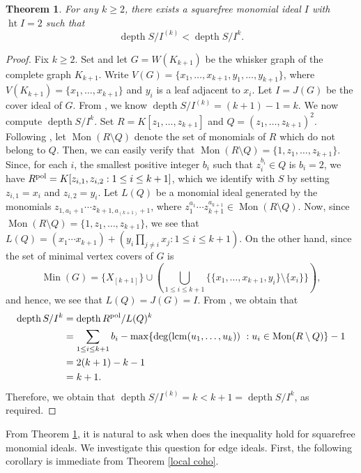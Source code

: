 \documentclass[12pt]{amsart}
\newtheorem{thm}{Theorem}[section]
\theoremstyle{definition}
\theoremstyle{remark}
\DeclareMathOperator{\depth}{depth}
\DeclareMathOperator{\height}{ht}
\DeclareMathOperator{\Min}{Min}
\DeclareMathOperator{\lcm}{lcm}
\begin{document}
\begin{thm}\label{ex}
For any $k\geq2$, there exists a squarefree monomial ideal $I$ with $\height I=2$ such that 
$$\depth S/I^{(k)}<\depth S/I^{k}.$$
\end{thm}
\begin{proof}
Fix $k\geq2$. Set and let $G=W(K_{k+1})$ be the whisker graph of the complete graph $K_{k+1}$. Write $V(G)=\{x_1,\ldots,x_{k+1},y_1,\ldots,y_{k+1}\}$,
where $V(K_{k+1})=\{x_1,\ldots,x_{k+1}\}$ and $y_i$ is a leaf adjacent to $x_i$. Let $I=J(G)$ be the cover ideal of $G$. From \cite[Corollary 3.2]{fy2024}, we know $\depth S/I^{(k)}=(k+1)-1=k$. We now compute $\depth S/I^k$. Set $R=K[z_1,\ldots,z_{k+1}]$ and $Q=(z_1,\ldots,z_{k+1})^{2}$. Following \cite{bhhm2015}, let $\operatorname{Mon}(R\setminus Q)$ denote the set of monomials of $R$ which do not belong to $Q$. Then, we can easily verify that $\operatorname{Mon}(R\setminus Q)=\{1,z_{1},\ldots,z_{k+1}\}$. Since, for each $i$, the smallest positive integer $b_i$ such that $z_i^{b_i}\in Q$ is $b_i=2$, we have $R^{\rm pol}=K[z_{i,1},z_{i,2}:1\leq i\leq k+1]$, which we identify with $S$ by setting $z_{i,1}=x_{i}$ and $z_{i,2}=y_{i}$. Let $L(Q)$ be a monomial ideal generated by the monomials $z_{1,a_1+1}\cdots z_{k+1,a_{(k+1)}+1}$, where $z_1^{a_1}\cdots z_{k+1}^{a_{k+1}}\in\operatorname{Mon}(R\setminus Q)$. Now, since $\operatorname{Mon}(R\setminus Q)=\{1,z_{1},\ldots,z_{k+1}\}$, we see that $L(Q)=(x_1\cdots x_{k+1})+(y_i\prod_{j\neq i}x_j:1\leq i\leq k+1)$. On the other hand, since the set of minimal vertex covers of $G$ is 
$$\Min(G)=\{X_{[k+1]}\}\cup(\bigcup_{1\leq i\leq k+1}\{\{x_{1},\ldots,x_{k+1}, y_{i}\}\setminus\{x_{i}\}\}),$$ and hence, we see that $L(Q)=J(G)=I$.
From \cite[Corollary 11]{bhhm2015}, we obtain that 
\begin{align*}
\depth S/I^{k}&=\depth R^{\rm pol}/L(Q)^{k} \\
&=\sum_{1\leq i\leq k+1}b_{i}-\max\{\deg(\lcm(u_{1},\ldots, u_{k}))\,\,: u_{i}\in\operatorname{Mon}(R\setminus Q)\}-1 \\
&=2(k+1)-k-1 \\
&=k+1.
\end{align*}
Therefore, we obtain that 
$\depth S/I^{(k)}=k<k+1=\depth S/I^{k}$, as required. 
\end{proof}

From Theorem \ref{ex}, it is natural to ask when does the inequality hold for squarefree monomial ideals. We investigate this question for edge ideals. First, the following corollary is immediate from Theorem \ref{local coho}.
\end{document}
